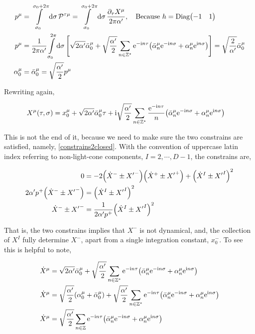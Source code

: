 \begin{align*}
    p^\mu&=\int\limits_{\sigma_0}^{\sigma_0+2\pi}\dd{\sigma}\mathcal P^{\tau\mu}=\int\limits_{\sigma_0}^{\sigma_0+2\pi}\dd{\sigma}\frac{\partial_\tau X^\mu}{2\pi\alpha'},\ \ \ \textnormal{Because }h=\textnormal{Diag}\mqty(-1&1)\\
    p^\mu&=\frac{1}{2\pi\alpha'}\int\limits_{\sigma_0}^{2\pi}\dd{\sigma}\qty[\sqrt{2\alpha'}{\bar\alpha_0}^\mu+\sqrt{\frac{\alpha'}{2}}\sum\limits_{n\in\mathbb Z^\ast}\e^{-\im n\tau}\qty({\bar\alpha}_n^\mu\e^{-\im n\sigma}+{\alpha}_n^\mu\e^{\im n\sigma})]=\sqrt{\frac{2}{\alpha'}}{\bar\alpha}_0^\mu\\
    \alpha_0^\mu&={\bar\alpha}_0^\mu=\sqrt{\frac{\alpha'}{2}}p^\mu
\end{align*}

Rewriting again,

\begin{align*}
    X^\mu\qty(\tau,\sigma)&=x_{0}^\mu+\sqrt{2\alpha'}{\bar\alpha}_0^\mu\tau+\textnormal{i}\sqrt{\frac{\alpha'}{2}}\sum\limits_{n\in\mathbb Z^\ast}\frac{\textnormal{e}^{-\textnormal{i} n\tau}}{n}\qty({\bar\alpha}^\mu_n\textnormal{e}^{-\textnormal{i} n\sigma}+{\alpha}^\mu_n\textnormal{e}^{\textnormal{i} n\sigma})
\end{align*}

This is not the end of it, because we need to make sure the two constrains are satisfied, namely, \ref{constrains2closed}. With the convention of 
uppercase latin index referring to non-light-cone components, $I=2,\cdots,D-1$, the constrains are,

\begin{align*}
    0&=-2\qty({\dot X}^-\pm{X'}^-)\qty({\dot X}^+\pm{X'}^+)+\qty({\dot X}^I\pm{X'}^I)^2\\
    2\alpha'p^+\qty({\dot X}^-\pm{X'}^-)&=\qty({\dot X}^I\pm{X'}^I)^2\\
    {\dot X}^-\pm{X'}^-&=\frac{1}{2\alpha'p^+}\qty({\dot X}^I\pm{X'}^I)^2
\end{align*}

That is, the two constrains implies that $X^-$ is not dynamical, and, the collection of $X^I$ fully determine $X^-$, 
apart from a single integration constant, $x_0^-$. To see this is helpful to note,

\begin{align*}
    {\dot X}^\mu&=\sqrt{2\alpha'}{\bar\alpha}_0^\mu+\sqrt{\frac{\alpha'}{2}}\sum\limits_{n\in\mathbb Z^\ast}\textnormal{e}^{-\textnormal{i} n\tau}\qty({\bar\alpha}^\mu_n\textnormal{e}^{-\textnormal{i} n\sigma}+{\alpha}^\mu_n\textnormal{e}^{\textnormal{i} n\sigma})\\
    {\dot X}^\mu&=\sqrt{\frac{\alpha'}{2}}\qty(\alpha_0^\mu+{\bar\alpha}_0^\mu)+\sqrt{\frac{\alpha'}{2}}\sum\limits_{n\in\mathbb Z^\ast}\textnormal{e}^{-\textnormal{i} n\tau}\qty({\bar\alpha}^\mu_n\textnormal{e}^{-\textnormal{i} n\sigma}+{\alpha}^\mu_n\textnormal{e}^{\textnormal{i} n\sigma})\\
    {\dot X}^\mu&=\sqrt{\frac{\alpha'}{2}}\sum\limits_{n\in\mathbb Z}\textnormal{e}^{-\textnormal{i} n\tau}\qty({\bar\alpha}^\mu_n\textnormal{e}^{-\textnormal{i} n\sigma}+{\alpha}^\mu_n\textnormal{e}^{\textnormal{i} n\sigma})
\end{align*}

